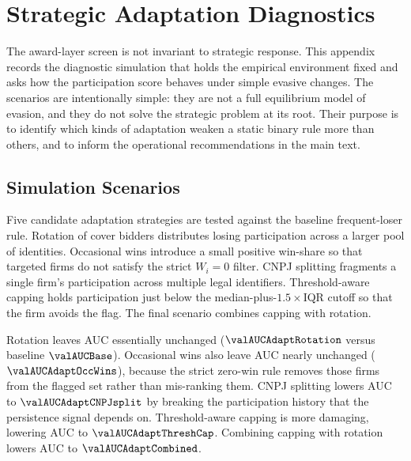\section{Strategic Adaptation Diagnostics}
\label{app:strategic_adaptation_v18}

The award-layer screen is not invariant to strategic response.
This appendix records the diagnostic simulation that holds the
empirical environment fixed and asks how the participation
score behaves under simple evasive changes. The scenarios are
intentionally simple: they are not a full equilibrium model of
evasion, and they do not solve the strategic problem at its
root. Their purpose is to identify which kinds of adaptation
weaken a static binary rule more than others, and to inform the
operational recommendations in the main text.

\subsection{Simulation Scenarios}
\label{app:adaptation_scenarios_v18}

Five candidate adaptation strategies are tested against the
baseline frequent-loser rule. Rotation of cover bidders
distributes losing participation across a larger pool of
identities. Occasional wins introduce a small positive
win-share so that targeted firms do not satisfy the strict
$W_i=0$ filter. CNPJ splitting fragments a single firm's
participation across multiple legal identifiers. Threshold-aware
capping holds participation just below the median-plus-$1.5\times$IQR
cutoff so that the firm avoids the flag. The final scenario
combines capping with rotation.

Rotation leaves AUC essentially unchanged
($\valAUCAdaptRotation$ versus baseline $\valAUCBase$).
Occasional wins also leave AUC nearly unchanged
($\valAUCAdaptOccWins$), because the strict zero-win rule
removes those firms from the flagged set rather than
mis-ranking them. CNPJ splitting lowers AUC to
$\valAUCAdaptCNPJsplit$ by breaking the participation history
that the persistence signal depends on. Threshold-aware capping
is more damaging, lowering AUC to $\valAUCAdaptThreshCap$.
Combining capping with rotation lowers AUC to
$\valAUCAdaptCombined$.

